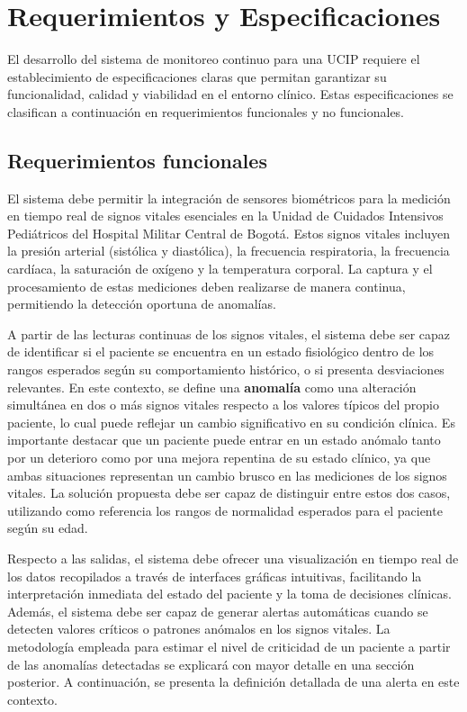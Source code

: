 \chapter{Requerimientos y Especificaciones}

El desarrollo del sistema de monitoreo continuo para una UCIP requiere el establecimiento de especificaciones claras que permitan garantizar su funcionalidad, calidad y viabilidad en el entorno clínico. Estas especificaciones se clasifican a continuación en requerimientos funcionales y no funcionales.

\section{Requerimientos funcionales}

El sistema debe permitir la integración de sensores biométricos para la medición en tiempo real de signos vitales esenciales en la Unidad de Cuidados Intensivos Pediátricos del Hospital Militar Central de Bogotá. Estos signos vitales incluyen la presión arterial (sistólica y diastólica), la frecuencia respiratoria, la frecuencia cardíaca, la saturación de oxígeno y la temperatura corporal. La captura y el procesamiento de estas mediciones deben realizarse de manera continua, permitiendo la detección oportuna de anomalías.

A partir de las lecturas continuas de los signos vitales, el sistema debe ser capaz de identificar si el paciente se encuentra en un estado fisiológico dentro de los rangos esperados según su comportamiento histórico, o si presenta desviaciones relevantes. En este contexto, se define una \textbf{anomalía} como una alteración simultánea en dos o más signos vitales respecto a los valores típicos del propio paciente, lo cual puede reflejar un cambio significativo en su condición clínica. Es importante destacar que un paciente puede entrar en un estado anómalo tanto por un deterioro como por una mejora repentina de su estado clínico, ya que ambas situaciones representan un cambio brusco en las mediciones de los signos vitales. La solución propuesta debe ser capaz de distinguir entre estos dos casos, utilizando como referencia los rangos de normalidad esperados para el paciente según su edad.

Respecto a las salidas, el sistema debe ofrecer una visualización en tiempo real de los datos recopilados a través de interfaces gráficas intuitivas, facilitando la interpretación inmediata del estado del paciente y la toma de decisiones clínicas. Además, el sistema debe ser capaz de generar alertas automáticas cuando se detecten valores críticos o patrones anómalos en los signos vitales. La metodología empleada para estimar el nivel de criticidad de un paciente a partir de las anomalías detectadas se explicará con mayor detalle en una sección posterior. A continuación, se presenta la definición detallada de una alerta en este contexto.

